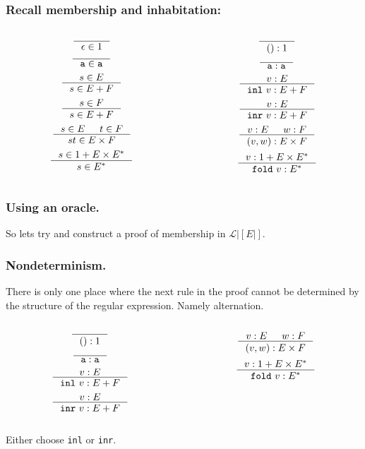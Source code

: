 \documentclass[slidestop,compress,mathserif, xcolor=table]{beamer}
\begin{document}
\begin{frame}
  \frametitle{Recall membership and inhabitation:}

  \begin{columns}[totalwidth=0.8\textwidth]
    \begin{column}{.5\textwidth}
      \[
      \inference{}{\epsilon \in 1}
      \]
      \[
      \inference{}{\texttt{a} \in \texttt{a}}
      \]
      \[
      \inference{s \in E}{s \in E + F}
      \]
      \[
      \inference{s \in F}{s \in E + F}
      \]
      \[
      \inference{s \in E & t \in F}{st \in E \times F}
      \]
      \[
      \inference{s \in 1 + E \times E^{\ast}}{s \in E^{\ast}}
      \]
    \end{column}
    \begin{column}{.5\textwidth}
      \[
      \inference{}{() : 1}
      \]
      \[
      \inference{}{\texttt{a} : \texttt{a}}
      \]
      \[
      \inference{v : E}{\mathtt{inl}\ v : E + F}
      \]
      \[
      \inference{v : E}{\mathtt{inr}\ v : E + F}
      \]
      \[
      \inference{v : E & w : F}{(v, w) : E \times F}
      \]
      \[
      \inference{v : 1 + E \times E^{\ast}}{\mathtt{fold}\ v : E^{\ast}}
      \]
    \end{column}
  \end{columns}
\end{frame}

\begin{frame}
  \frametitle{Using an oracle.}
  So lets try and construct a proof of membership in $\mathcal{L}|[E|]$.
\end{frame}

\begin{frame}
  \frametitle{Nondeterminism.}
  There is only one place where the next rule in the proof cannot be determined
  by the structure of the regular expression. Namely alternation.

  \begin{columns}[totalwidth=0.8\textwidth]
    \begin{column}{.5\textwidth}
      \[
      \inference{}{() : 1}
      \]
      \[
      \inference{}{\texttt{a} : \texttt{a}}
      \]
      \[
      \inference{v : E}{\mathtt{inl}\ v : E + F}
      \]
      \[
      \inference{v : E}{\mathtt{inr}\ v : E + F}
      \]
    \end{column}
    \begin{column}{.5\textwidth}
      \[
      \inference{v : E & w : F}{(v, w) : E \times F}
      \]
      \[
      \inference{v : 1 + E \times E^{\ast}}{\mathtt{fold}\ v : E^{\ast}}
      \]
    \end{column}
  \end{columns}

  \vspace{1em}
  Either choose \texttt{inl} or \texttt{inr}.
\end{frame}
\end{document}
